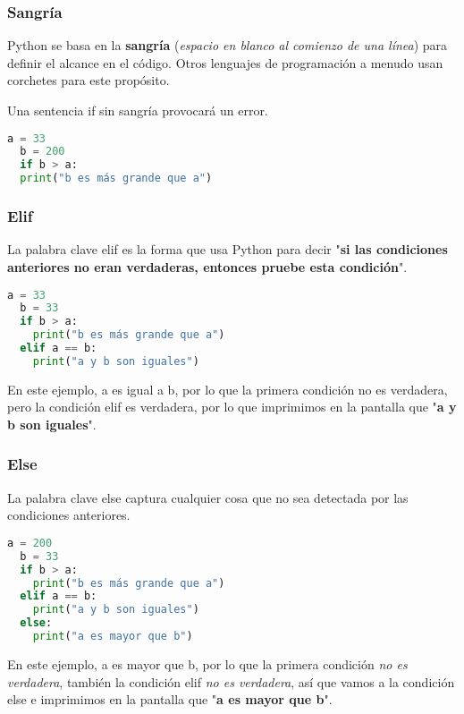 \begin{frame}[fragile]
  \frametitle{Sangría}

  Python se basa en la \textbf{sangría} (\emph{espacio en blanco al comienzo
  de una línea}) para definir el alcance en el código. Otros lenguajes
  de programación a menudo usan corchetes para este propósito.

  \pausa
  \vspace{\baselineskip}
  \begin{alertblock}{}
    Una sentencia if sin sangría provocará un error.
  \end{alertblock}

  \vspace{\baselineskip}
  \begin{lstlisting}[language=Python]
  a = 33
  b = 200
  if b > a:
  print("b es más grande que a")
  \end{lstlisting}
\end{frame}

\begin{frame}[fragile]
  \frametitle{Elif}

  La palabra clave \textcolor{codeKeyword}{elif} es la forma que usa Python
  para decir "\textbf{si las condiciones anteriores no eran verdaderas,
  entonces pruebe esta condición}".

  \vspace{\baselineskip}
  \begin{lstlisting}[language=Python]
  a = 33
  b = 33
  if b > a:
    print("b es más grande que a")
  elif a == b:
    print("a y b son iguales")
  \end{lstlisting}

  En este ejemplo, a es igual a b, por lo que la primera condición no es
  verdadera, pero la condición \textcolor{codeKeyword}{elif} es verdadera,
  por lo que imprimimos en la pantalla que "\textbf{a y b son iguales}".
\end{frame}

\begin{frame}[fragile]
  \frametitle{Else}

  La palabra clave \textcolor{codeKeyword}{else} captura cualquier cosa que
  no sea detectada por las condiciones anteriores.

  \vspace{\baselineskip}
  \begin{lstlisting}[language=Python]
  a = 200
  b = 33
  if b > a:
    print("b es más grande que a")
  elif a == b:
    print("a y b son iguales")
  else:
    print("a es mayor que b")
  \end{lstlisting}

  En este ejemplo, a es mayor que b, por lo que la primera condición
  \emph{no es verdadera}, también la condición \textcolor{codeKeyword}{elif}
  \emph{no es verdadera}, así que vamos a la condición
  \textcolor{codeKeyword}{else} e imprimimos en la pantalla
  que "\textbf{a es mayor que b}".
\end{frame}

